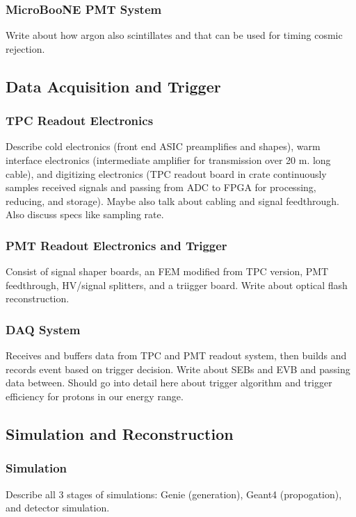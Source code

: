   \subsubsection{MicroBooNE PMT System}
    Write about how argon also scintillates and that can be used for timing cosmic rejection.

\subsection{Data Acquisition and Trigger}\label{daq}
  \subsubsection{TPC Readout Electronics}
    Describe cold electronics (front end ASIC preamplifies and shapes), warm interface electronics (intermediate amplifier for transmission over 20 m. long cable), and digitizing electronics (TPC readout board in crate continuously samples received signals and passing from ADC to FPGA for processing, reducing, and storage). Maybe also talk about cabling and signal feedthrough. Also discuss specs like sampling rate.
  \subsubsection{PMT Readout Electronics and Trigger}
    Consist of signal shaper boards, an FEM modified from TPC version, PMT feedthrough, HV/signal splitters, and a triigger board. Write about optical flash reconstruction.
  \subsubsection{DAQ System}
    Receives and buffers data from TPC and PMT readout system, then builds and records event based on trigger decision. Write about SEBs and EVB and passing data between. Should go into detail here about trigger algorithm and trigger efficiency for protons in our energy range.

\subsection{Simulation and Reconstruction}\label{reco}
  \subsubsection{Simulation}
    Describe all 3 stages of simulations: Genie (generation), Geant4 (propogation), and detector simulation.
